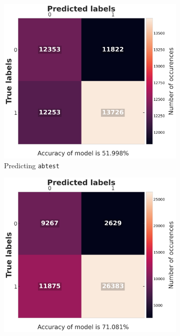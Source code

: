 \begin{figure}[h]
	\begin{center}
		\begin{subfigure}{0.32\textwidth}
			\includegraphics[width=0.99\linewidth]{./images/fig_6_linear_abtest.png} 
			\caption{Predicting \texttt{abtest}}
		\end{subfigure}
		\begin{subfigure}{0.32\textwidth}
			\includegraphics[width=0.99\linewidth]{./images/fig_7_linear_gearbox.png} 

\end{subfigure}
\end{center}
\end{figure}
